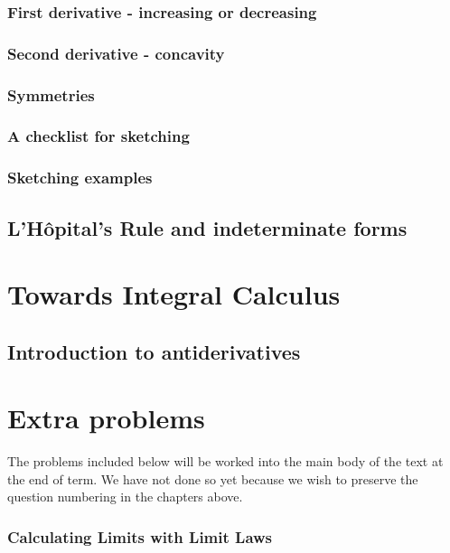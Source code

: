 \documentclass[12pt,letterpaper]{book}
\begin{document}
\subsection{First derivative - increasing or decreasing}

\subsection{Second derivative - concavity}

\subsection{Symmetries}

%
\subsection{A checklist for sketching} 
%
\subsection{Sketching examples}

\section{L'H\^opital's Rule and indeterminate forms}


\chapter{Towards Integral Calculus}
\section{Introduction to antiderivatives}


\chapter{Extra problems}
The problems included below will be worked into the main body of the text at the end of term. We have not done so yet because we wish to preserve the question numbering in the chapters above.

\setcounter{section}{1}\setcounter{subsection}{3}
\subsection{Calculating Limits with Limit Laws}

\end{document}
